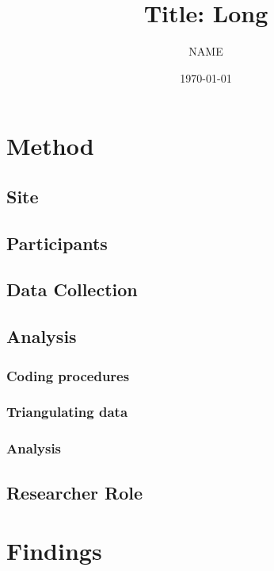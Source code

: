 



\title{Title: Long}
\author{NAME}
\date{\today}
\maketitle

\section{Method}
\subsection{Site}
\subsection{Participants}
\subsection{Data Collection}
\subsection{Analysis}
\subsubsection{Coding procedures}
\subsubsection{Triangulating data}
\subsubsection{Analysis}
\subsection{Researcher Role}

\section{Findings}
